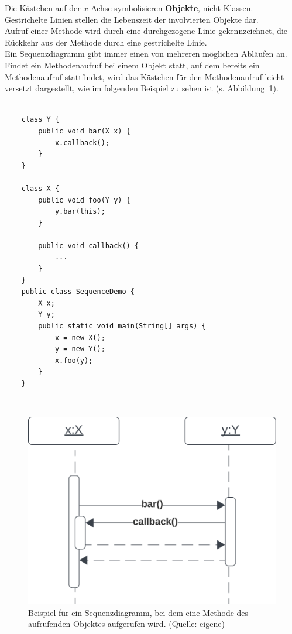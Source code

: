 \noindent
Die Kästchen auf der $x$-Achse symbolisieren \textbf{Objekte}, \ul{nicht} Klassen.\\

\noindent
Gestrichelte Linien stellen die Lebenszeit der involvierten Objekte dar.\\

\noindent
Aufruf einer Methode wird durch eine durchgezogene Linie gekennzeichnet, die Rückkehr aus der Methode durch eine
gestrichelte Linie.\\

\noindent
Ein Sequenzdiagramm gibt immer einen von mehreren möglichen Abläufen an.\\

\noindent
Findet ein Methodenaufruf bei einem Objekt statt, auf dem bereits ein Methodenaufruf stattfindet, wird das Kästchen für den Methodenaufruf leicht versetzt dargestellt, wie im folgenden Beispiel zu sehen ist (s. Abbildung~\ref{fig:callback}).

\begin{verbatim}

    class Y {
        public void bar(X x) {
            x.callback();
        }
    }

    class X {
        public void foo(Y y) {
            y.bar(this);
        }

        public void callback() {
            ...
        }
    }
    public class SequenceDemo {
        X x;
        Y y;
        public static void main(String[] args) {
            x = new X();
            y = new Y();
            x.foo(y);
        }
    }
\end{verbatim}\\

\begin{figure}
    \centering
    \includegraphics[scale=0.5]{chapters/fopt3/img/callback}
    \caption{Beispiel für ein Sequenzdiagramm, bei dem eine Methode des aufrufenden Objektes aufgerufen wird. (Quelle: eigene)}
    \label{fig:callback}
\end{figure}

